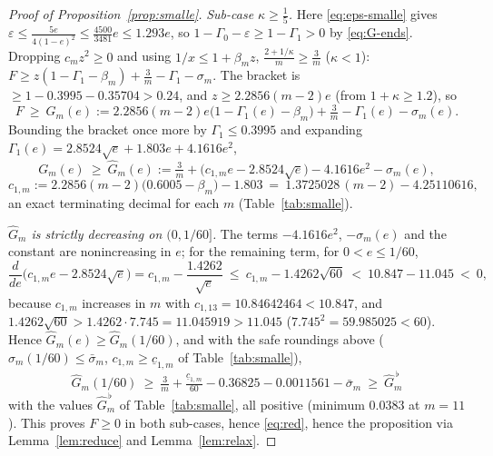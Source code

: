 \documentclass[11pt]{amsart}
\newcommand{\eps}{\varepsilon}
\begin{document}
\begin{proof}[Proof of Proposition~\ref{prop:smalle}]
\emph{Sub-case $\kappa\ge\tfrac15$.}  Here \eqref{eq:eps-smalle} gives
$\eps\le\tfrac{5e}{4(1-e)^2}\le\tfrac{4500}{3481}e\le1.293e$, so
$1-\Gamma_0-\eps\ge1-\Gamma_1>0$ by \eqref{eq:G-ends}.  Dropping $c_mz^2\ge0$
and using $1/x\le1+\beta_mz$, $\tfrac{2+1/\kappa}m\ge\tfrac3m$ ($\kappa<1$):
$F\ge z(1-\Gamma_1-\beta_m)+\tfrac3m-\Gamma_1-\sigma_m$.  The bracket is
$\ge1-0.3995-0.35704>0.24$, and $z\ge2.2856(m-2)e$ (from $1+\kappa\ge1.2$), so
\begin{equation}\label{eq:Gm}
 F\ \ge\ G_m(e):=2.2856(m-2)e\bigl(1-\Gamma_1(e)-\beta_m\bigr)
 +\tfrac3m-\Gamma_1(e)-\sigma_m(e) .
\end{equation}
Bounding the bracket once more by $\Gamma_1\le0.3995$ and expanding
$\Gamma_1(e)=2.8524\sqrt e+1.803e+4.1616e^2$,
\begin{equation}\label{eq:Ghat}
 G_m(e)\ \ge\ \widehat G_m(e):=\tfrac3m+\bigl(c_{1,m}e-2.8524\sqrt e\bigr)
 -4.1616e^2-\sigma_m(e),
\end{equation}
\begin{equation}\label{eq:c1}
 c_{1,m}:=2.2856(m-2)\bigl(0.6005-\beta_m\bigr)-1.803
 \ =\ 1.3725028\,(m-2)-4.25110616,
\end{equation}
an exact terminating decimal for each $m$ (Table~\ref{tab:smalle}).

\emph{$\widehat G_m$ is strictly decreasing on $(0,1/60]$.}  The terms
$-4.1616e^2$, $-\sigma_m(e)$ and the constant are nonincreasing in $e$; for the
remaining term, for $0<e\le1/60$,
\[
 \frac{d}{de}\bigl(c_{1,m}e-2.8524\sqrt e\bigr)
 =c_{1,m}-\frac{1.4262}{\sqrt e}\ \le\ c_{1,m}-1.4262\sqrt{60}
 \ <\ 10.847-11.045\ <\ 0,
\]
because $c_{1,m}$ increases in $m$ with $c_{1,13}=10.84642464<10.847$, and
$1.4262\sqrt{60}>1.4262\cdot7.745=11.045919>11.045$ ($7.745^2=59.985025<60$).
Hence $\widehat G_m(e)\ge\widehat G_m(1/60)$, and with the safe roundings above
($\sigma_m(1/60)\le\bar\sigma_m$, $c_{1,m}\ge\underline c_{1,m}$ of
Table~\ref{tab:smalle}),
\[
 \widehat G_m(1/60)\ \ge\ \tfrac3m+\tfrac{\underline c_{1,m}}{60}
 -0.36825-0.0011561-\bar\sigma_m\ \ge\ \widehat G_m^{\,\flat}
\]
with the values $\widehat G_m^{\,\flat}$ of Table~\ref{tab:smalle}, all
positive (minimum $0.0383$ at $m=11$).  This proves $F\ge0$ in both sub-cases,
hence \eqref{eq:red}, hence the proposition via Lemma~\ref{lem:reduce} and
Lemma~\ref{lem:relax}.
\end{proof}
\end{document}
